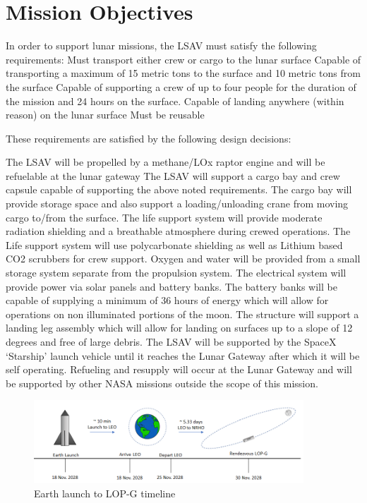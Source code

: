 \documentclass[10pt]{article}
\begin{document}
\section{Mission Objectives}

In order to support lunar missions, the LSAV must satisfy the
following requirements: Must transport either crew or cargo to the
lunar surface Capable of transporting a maximum of 15 metric tons to
the surface and 10 metric tons from the surface Capable of supporting
a crew of up to four people for the duration of the mission and 24
hours on the surface.  Capable of landing anywhere (within reason) on
the lunar surface Must be reusable

These requirements are satisfied by the following design decisions:

The LSAV will be propelled by a methane/LOx raptor engine and will be
refuelable at the lunar gateway The LSAV will support a cargo bay and
crew capsule capable of supporting the above noted requirements. The
cargo bay will provide storage space and also support a
loading/unloading crane from moving cargo to/from the surface.  The
life support system will provide moderate radiation shielding and a
breathable atmosphere during crewed operations. The Life support
system will use polycarbonate shielding as well as Lithium based CO2
scrubbers for crew support. Oxygen and water will be provided from a
small storage system separate from the propulsion system.  The
electrical system will provide power via solar panels and battery
banks. The battery banks will be capable of supplying a minimum of 36
hours of energy which will allow for operations on non illuminated
portions of the moon.  The structure will support a landing leg
assembly which will allow for landing on surfaces up to a slope of 12
degrees and free of large debris.  The LSAV will be supported by the
SpaceX ‘Starship’ launch vehicle until it reaches the Lunar Gateway
after which it will be self operating.  Refueling and resupply will
occur at the Lunar Gateway and will be supported by other NASA
missions outside the scope of this mission.

\begin{figure}[H]
  \centering
  \includegraphics[width=0.9\textwidth]{toon1}
  \caption{Earth launch to LOP-G timeline}
  \label{fig:toon1}
\end{figure}
\end{document}
